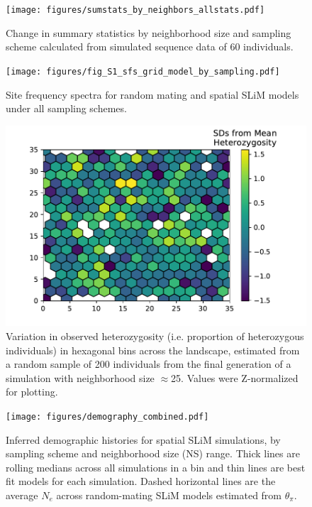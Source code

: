 \documentclass[10pt,twoside,lineno,hidelinks]{preprint}
\begin{document}
\begin{figure}[p]
\centering
\texttt{[image: figures/sumstats\_by\_neighbors\_allstats.pdf]}
\caption{Change in summary statistics by neighborhood size and sampling scheme calculated from simulated sequence data of 60 individuals.}
\label{fig:allsumstats} 
\end{figure}
\FloatBarrier


\begin{figure}[p]
\centering
\texttt{[image: figures/fig\_S1\_sfs\_grid\_model\_by\_sampling.pdf]}
\caption{Site frequency spectra for random mating and spatial SLiM models under all sampling schemes.}
\label{fig:allsfs}
\end{figure}
\FloatBarrier

\begin{figure}[p]
\centering
\includegraphics[]{figures/het_z_by_ind.pdf}
\caption{Variation in observed heterozygosity (i.e. proportion of heterozygous individuals) in hexagonal bins across the landscape, estimated from a random sample of 200 individuals from the final generation of a simulation with neighborhood size $\approx$25. Values were Z-normalized for plotting.}
\label{fig:hetmap}
\end{figure}
\FloatBarrier

\begin{figure}[p]
\centering
\texttt{[image: figures/demography\_combined.pdf]}
\caption{Inferred demographic histories for spatial SLiM simulations, by sampling scheme and neighborhood size (NS) range. Thick lines are rolling medians across all simulations in a bin and thin lines are best fit models for each simulation. Dashed horizontal lines are the average $N_{e}$ across random-mating SLiM models estimated from $\theta_{\pi}$.}
\label{fig:demography_supplement}
\end{figure}
\FloatBarrier
\end{document}
